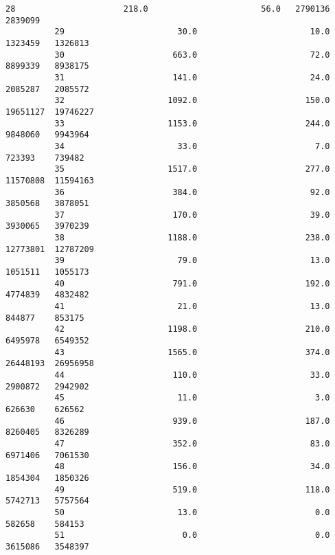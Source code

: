 \documentclass[11pt]{article}
\begin{document}
\begin{Verbatim}[commandchars=\\\{\}]
          28                      218.0                       56.0   2790136   2839099   
          29                       30.0                       10.0   1323459   1326813   
          30                      663.0                       72.0   8899339   8938175   
          31                      141.0                       24.0   2085287   2085572   
          32                     1092.0                      150.0  19651127  19746227   
          33                     1153.0                      244.0   9848060   9943964   
          34                       33.0                        7.0    723393    739482   
          35                     1517.0                      277.0  11570808  11594163   
          36                      384.0                       92.0   3850568   3878051   
          37                      170.0                       39.0   3930065   3970239   
          38                     1188.0                      238.0  12773801  12787209   
          39                       79.0                       13.0   1051511   1055173   
          40                      791.0                      192.0   4774839   4832482   
          41                       21.0                       13.0    844877    853175   
          42                     1198.0                      210.0   6495978   6549352   
          43                     1565.0                      374.0  26448193  26956958   
          44                      110.0                       33.0   2900872   2942902   
          45                       11.0                        3.0    626630    626562   
          46                      939.0                      187.0   8260405   8326289   
          47                      352.0                       83.0   6971406   7061530   
          48                      156.0                       34.0   1854304   1850326   
          49                      519.0                      118.0   5742713   5757564   
          50                       13.0                        0.0    582658    584153   
          51                        0.0                        0.0   3615086   3548397   
          

\end{Verbatim}
\end{document}
